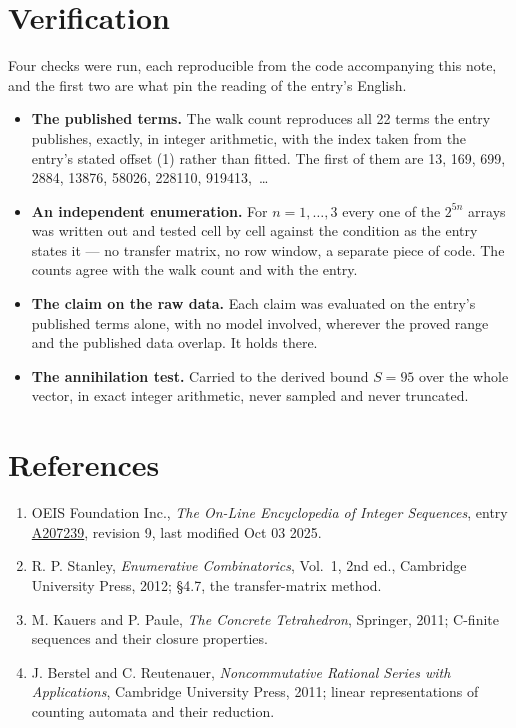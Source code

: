 \documentclass[11pt]{article}
\theoremstyle{definition}
\begin{document}
\section{Verification}

Four checks were run, each reproducible from the code accompanying this note, and the first two are what pin the reading of the entry's English.

\begin{itemize}

\item {\bfseries The published terms.} The walk count reproduces all 22 terms the entry publishes, exactly, in integer arithmetic, with the index taken from the entry's stated offset (1) rather than fitted. The first of them are 13, 169, 699, 2884, 13876, 58026, 228110, 919413,~\dots

\item {\bfseries An independent enumeration.} For $n = 1,\dots,3$ every one of the $2^{5n}$ arrays was written out and tested cell by cell against the condition as the entry states it --- no transfer matrix, no row window, a separate piece of code. The counts agree with the walk count and with the entry.

\item {\bfseries The claim on the raw data.} Each claim was evaluated on the entry's published terms alone, with no model involved, wherever the proved range and the published data overlap. It holds there.

\item {\bfseries The annihilation test.} Carried to the derived bound $S = 95$ over the whole vector, in exact integer arithmetic, never sampled and never truncated.

\end{itemize}

\section{References}

\begin{enumerate}

\item OEIS Foundation Inc., \emph{The On-Line Encyclopedia of Integer Sequences}, entry \href{https://oeis.org/A207239}{A207239}, revision 9, last modified Oct 03 2025.

\item R. P. Stanley, \emph{Enumerative Combinatorics}, Vol.~1, 2nd ed., Cambridge University Press, 2012; \S4.7, the transfer-matrix method.

\item M. Kauers and P. Paule, \emph{The Concrete Tetrahedron}, Springer, 2011; C-finite sequences and their closure properties.

\item J. Berstel and C. Reutenauer, \emph{Noncommutative Rational Series with Applications}, Cambridge University Press, 2011; linear representations of counting automata and their reduction.

\end{enumerate}
\end{document}
